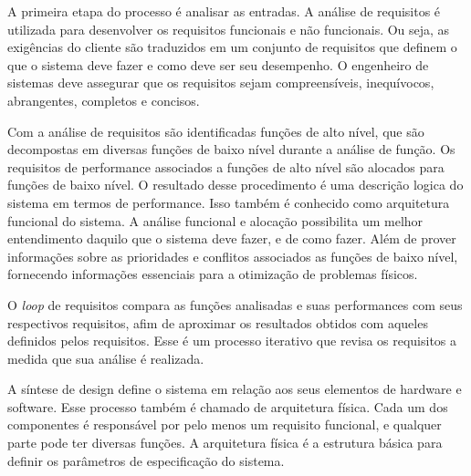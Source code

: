     \begin{figure}[h!]
        \centering
    \end{figure}
    
    A primeira etapa do processo é analisar as entradas. A análise de requisitos é utilizada para desenvolver os requisitos funcionais e não funcionais. Ou seja, as exigências do cliente são traduzidos em um conjunto de requisitos que definem o que o sistema deve fazer e como deve ser seu desempenho. O engenheiro de sistemas deve assegurar que os requisitos sejam compreensíveis, inequívocos, abrangentes, completos e concisos.
    
    Com a análise de requisitos são identificadas funções de alto nível, que são decompostas em diversas funções de baixo nível durante a análise de função. Os requisitos de performance associados a funções de alto nível são alocados para funções de baixo nível. O resultado desse procedimento é uma descrição logica do sistema em termos de performance. Isso também é conhecido como arquitetura funcional do sistema. A análise funcional e alocação possibilita um melhor entendimento daquilo que o sistema deve fazer, e de como fazer. Além de prover informações sobre as prioridades e conflitos associados as funções de baixo nível, fornecendo informações essenciais para a otimização de problemas físicos.
    
    O \textit{loop} de requisitos compara as funções analisadas e suas performances com seus respectivos requisitos, afim de aproximar os resultados obtidos com aqueles definidos pelos requisitos. Esse é um processo iterativo que revisa os requisitos a medida que sua análise é realizada. 
    
    A síntese de design define o sistema em relação aos seus elementos de hardware e software. Esse processo também é chamado de arquitetura física. Cada um dos componentes é responsável por pelo menos um requisito funcional, e qualquer parte pode ter diversas funções. A arquitetura física é a estrutura básica para definir os parâmetros de especificação do sistema.

